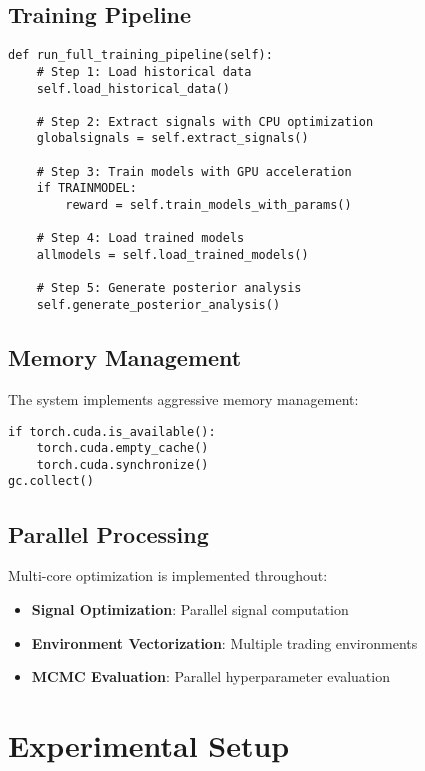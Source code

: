 \documentclass[11pt,a4paper]{article}
\begin{document}
\subsection{Training Pipeline}

\begin{lstlisting}[caption={Training Pipeline (model\_trainer.py:432-467)}]
def run_full_training_pipeline(self):
    # Step 1: Load historical data
    self.load_historical_data()
    
    # Step 2: Extract signals with CPU optimization
    globalsignals = self.extract_signals()
    
    # Step 3: Train models with GPU acceleration
    if TRAINMODEL:
        reward = self.train_models_with_params()
    
    # Step 4: Load trained models
    allmodels = self.load_trained_models()
    
    # Step 5: Generate posterior analysis
    self.generate_posterior_analysis()
\end{lstlisting}

\subsection{Memory Management}

The system implements aggressive memory management:

\begin{lstlisting}[caption={GPU Memory Management (model\_trainer.py:220-235)}]
if torch.cuda.is_available():
    torch.cuda.empty_cache()
    torch.cuda.synchronize()
gc.collect()
\end{lstlisting}

\subsection{Parallel Processing}

Multi-core optimization is implemented throughout:

\begin{itemize}
    \item \textbf{Signal Optimization}: Parallel signal computation
    \item \textbf{Environment Vectorization}: Multiple trading environments
    \item \textbf{MCMC Evaluation}: Parallel hyperparameter evaluation
\end{itemize}

\section{Experimental Setup}
\end{document}
